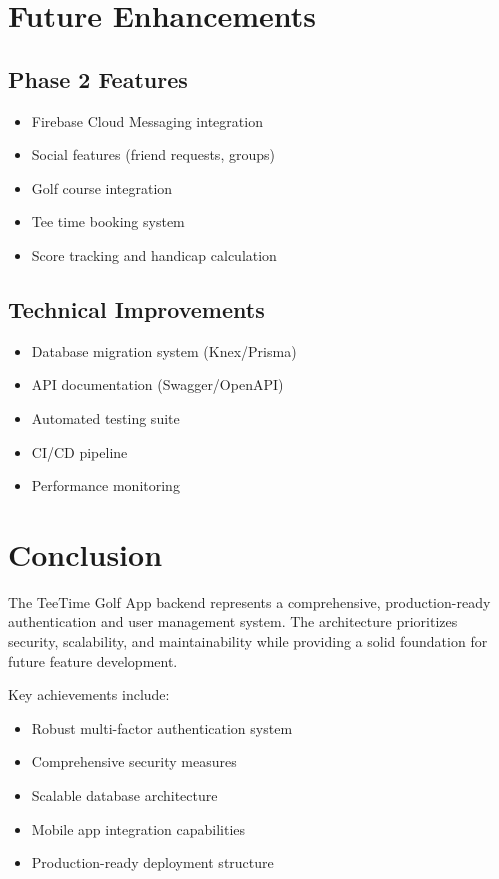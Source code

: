 \documentclass[12pt,a4paper]{article}
\begin{document}
\section{Future Enhancements}

\subsection{Phase 2 Features}
\begin{itemize}
    \item Firebase Cloud Messaging integration
    \item Social features (friend requests, groups)
    \item Golf course integration
    \item Tee time booking system
    \item Score tracking and handicap calculation
\end{itemize}

\subsection{Technical Improvements}
\begin{itemize}
    \item Database migration system (Knex/Prisma)
    \item API documentation (Swagger/OpenAPI)
    \item Automated testing suite
    \item CI/CD pipeline
    \item Performance monitoring
\end{itemize}

\section{Conclusion}

The TeeTime Golf App backend represents a comprehensive, production-ready authentication and user management system. The architecture prioritizes security, scalability, and maintainability while providing a solid foundation for future feature development.

Key achievements include:
\begin{itemize}
    \item Robust multi-factor authentication system
    \item Comprehensive security measures
    \item Scalable database architecture
    \item Mobile app integration capabilities
    \item Production-ready deployment structure
\end{itemize}
\end{document}
